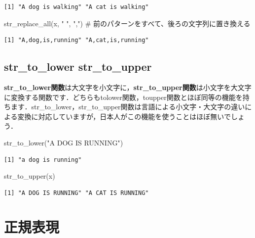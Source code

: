 \documentclass[
  letterpaper,
  DIV=11,
  numbers=noendperiod]{scrreprt}
\newenvironment{Shaded}{\begin{snugshade}}{\end{snugshade}}
\newcommand{\CommentTok}[1]{\textcolor[rgb]{0.37,0.37,0.37}{#1}}
\newcommand{\FunctionTok}[1]{\textcolor[rgb]{0.28,0.35,0.67}{#1}}
\newcommand{\NormalTok}[1]{\textcolor[rgb]{0.00,0.23,0.31}{#1}}
\newcommand{\StringTok}[1]{\textcolor[rgb]{0.13,0.47,0.30}{#1}}
\begin{document}
\begin{verbatim}
[1] "A dog is walking" "A cat is walking"
\end{verbatim}

\begin{Shaded}
\begin{Highlighting}[]
\FunctionTok{str\_replace\_all}\NormalTok{(x, }\StringTok{" "}\NormalTok{, }\StringTok{","}\NormalTok{) }\CommentTok{\# 前のパターンをすべて、後ろの文字列に置き換える}
\end{Highlighting}
\end{Shaded}

\begin{verbatim}
[1] "A,dog,is,running" "A,cat,is,running"
\end{verbatim}

\hypertarget{str_to_lower-str_to_upper}{%
\subsection{str\_to\_lower
str\_to\_upper}\label{str_to_lower-str_to_upper}}

\textbf{str\_to\_lower関数}は大文字を小文字に，\textbf{str\_to\_upper関数}は小文字を大文字に変換する関数です．どちらもtolower関数，toupper関数とほぼ同等の機能を持ちます．str\_to\_lower，str\_to\_upper関数は言語による小文字・大文字の違いによる変換に対応していますが，日本人がこの機能を使うことはほぼ無いでしょう．

\begin{Shaded}
\begin{Highlighting}[]
\FunctionTok{str\_to\_lower}\NormalTok{(}\StringTok{"A DOG IS RUNNING"}\NormalTok{)}
\end{Highlighting}
\end{Shaded}

\begin{verbatim}
[1] "a dog is running"
\end{verbatim}

\begin{Shaded}
\begin{Highlighting}[]
\FunctionTok{str\_to\_upper}\NormalTok{(x)}
\end{Highlighting}
\end{Shaded}

\begin{verbatim}
[1] "A DOG IS RUNNING" "A CAT IS RUNNING"
\end{verbatim}

\hypertarget{ux6b63ux898fux8868ux73fe}{%
\section{正規表現}\label{ux6b63ux898fux8868ux73fe}}
\end{document}
